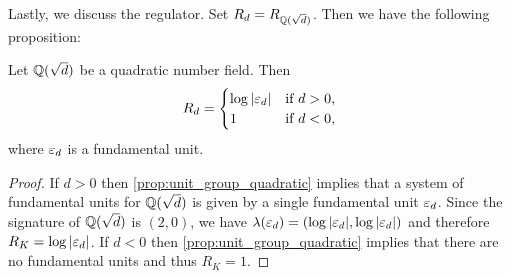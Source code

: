     Lastly, we discuss the regulator. Set $R_{d} = R_{\mathbb{Q}(\sqrt{d})}$. Then we have the following proposition:

    \begin{proposition}\label{prop:regulator_quadratic}
      Let $\mathbb{Q}(\sqrt{d})$ be a quadratic number field. Then
      \[
        R_{d} = \begin{cases} \log|\varepsilon_{d}| & \text{if $d > 0$}, \\ 1 & \text{if $d < 0$}, \end{cases}
      \]
      where $\varepsilon_{d}$ is a fundamental unit.
    \end{proposition}
    \begin{proof}
      If $d > 0$ then \cref{prop:unit_group_quadratic} implies that a system of fundamental units for $\mathbb{Q}(\sqrt{d})$ is given by a single fundamental unit $\varepsilon_{d}$. Since the signature of $\mathbb{Q}(\sqrt{d})$ is $(2,0)$, we have $\lambda(\varepsilon_{d}) = (\log|\varepsilon_{d}|,\log|\varepsilon_{d}|)$ and therefore $R_{K} = \log|\varepsilon_{d}|$. If $d < 0$ then \cref{prop:unit_group_quadratic} implies that there are no fundamental units and thus $R_{K} = 1$.
    \end{proof}
